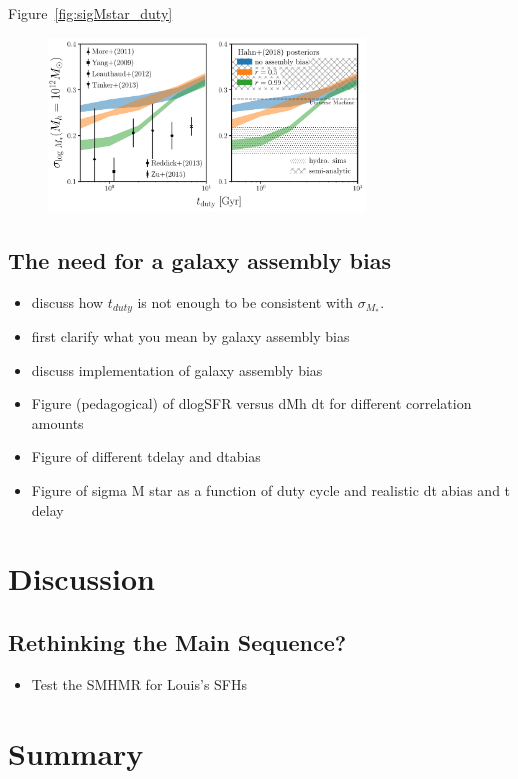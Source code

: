 \documentclass[12pt, letterpaper, preprint]{aastex}
\newcommand{\bitem}{\begin{itemize}}
\newcommand{\eitem}{\end{itemize}}
\begin{document}
Figure~\ref{fig:sigMstar_duty} 

\begin{figure}
\begin{center}
\includegraphics[width=0.75\textwidth]{figs/SHMRscatter_tduty_abias2.pdf}
\caption{}
\label{fig:sigMstar_duty_abias}
\end{center}
\end{figure}
\subsection{The need for a galaxy assembly bias}
\bitem
\item discuss how $t_{duty}$ is not enough to be consistent with $\sigma_{M_*}$. 
\item first clarify what you mean by galaxy assembly bias 
\item discuss implementation of galaxy assembly bias
\item Figure (pedagogical) of dlogSFR versus dMh dt for different correlation amounts 
\item Figure of different tdelay and dtabias 
\item Figure of sigma M star as a function of duty cycle and realistic dt abias and t delay 
\eitem

\section{Discussion} \label{sec:discussion}
\subsection{Rethinking the Main Sequence?}
\bitem 
\item Test the SMHMR for Louis's SFHs 
\eitem 

\section{Summary} \label{sec:summary}
\end{document}
